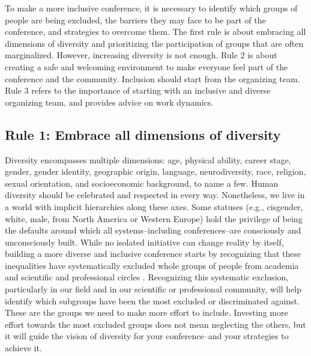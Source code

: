 \documentclass[10pt,letterpaper]{article}
\begin{document}
To make a more inclusive conference, it is necessary to identify which groups of people are being excluded, the barriers they may face to be part of the conference, and strategies to overcome them. 
The first rule is about embracing all dimensions of diversity and prioritizing the
 participation of groups that are often marginalized.
However, increasing diversity is not enough. Rule 2 is about creating a safe and welcoming environment to make everyone feel part of the conference and the community. 
Inclusion should start from the organizing team. Rule 3 refers to the importance of starting with an inclusive and diverse organizing team, and provides advice on work dynamics.


\subsection*{Rule 1: Embrace all dimensions of diversity}
\label{rule_diversity}

Diversity encompasses multiple dimensions: age, physical ability, career stage, gender, gender identity, geographic origin, language, neurodiversity, race, religion, sexual orientation, and socioeconomic background, to name a few.
Human diversity should be celebrated and respected in every way. Nonetheless, we live in a world with implicit hierarchies along these axes. Some statuses (e.g., cisgender, white, male, from North America or Western Europe) hold the privilege of being the defaults around which all systems--including conferences--are consciously and unconsciously built. 
While no isolated initiative can change reality by itself, building a more diverse and inclusive conference starts by recognizing that these inequalities have systematically excluded whole groups of people from academia and scientific and professional circles \cite{timperleyHeMoanaPukepuke2020}. 
Recognizing this systematic exclusion, particularly in our field and in our scientific or professional community, will help identify which subgroups have been the most excluded or discriminated against.
These are the groups we need to make more effort to include.
Investing more effort towards the most excluded groups does not mean neglecting the others, but it will guide the vision of diversity for your conference--and your strategies to achieve it.
\end{document}
